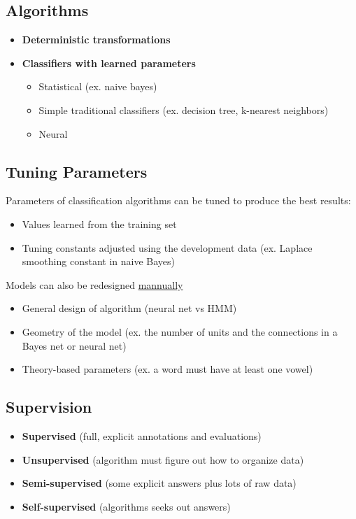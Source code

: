   \subsection{Algorithms}

    \begin{itemize}
      \item \textbf{Deterministic transformations}
      \item \textbf{Classifiers with learned parameters}
      \begin{itemize}
        \item Statistical (ex. naive bayes)
        \item Simple traditional classifiers (ex. decision tree, k-nearest neighbors)
        \item Neural
      \end{itemize}
    \end{itemize}

  \subsection{Tuning Parameters}

    Parameters of classification algorithms can be tuned to produce the
    best results:

    \begin{itemize}
      \item Values learned from the training set
      \item Tuning constants adjusted using the development data
      (ex. Laplace smoothing constant in naive Bayes)
    \end{itemize}

    Models can also be redesigned \ul{mannually}

    \begin{itemize}
      \item General design of algorithm (neural net vs HMM)
      \item Geometry of the model (ex. the number of units and
      the connections in a Bayes net or neural net)
      \item Theory-based parameters (ex. a word must have at least one vowel)
    \end{itemize}

  \subsection{Supervision}

    \begin{itemize}
      \item \textbf{Supervised} (full, explicit annotations and evaluations)
      \item \textbf{Unsupervised} (algorithm must figure out how to organize data)
      \item \textbf{Semi-supervised} (some explicit answers plus lots of raw data)
      \item \textbf{Self-supervised} (algorithms seeks out answers)
    \end{itemize}

